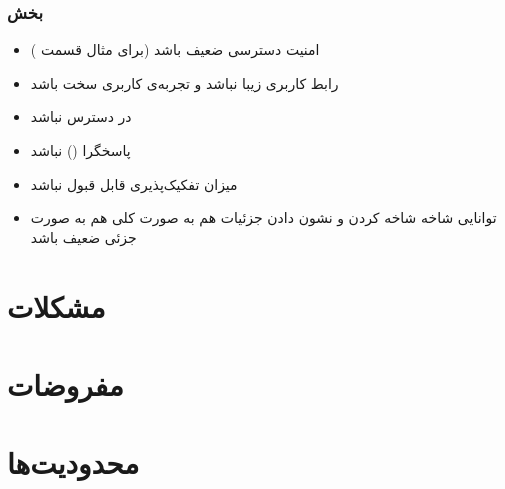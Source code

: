 \subsubsection{بخش }
\begin{itemize}
\item[\risk]
امنیت دسترسی ضعیف باشد (برای مثال قسمت )

\item[\risk]
رابط کاربری زیبا نباشد و تجربه‌ی کاربری سخت باشد

\item[\risk]
در دسترس نباشد

\item[\risk]
پاسخگرا () نباشد

\item[\risk]
میزان تفکیک‌پذیری قابل قبول نباشد

\item[\risk]
توانایی شاخه شاخه کردن و نشون دادن جزئیات هم به صورت کلی هم به صورت جزئی ضعیف باشد
\end{itemize}

\section{مشکلات }

\section{مفروضات }

\section{محدودیت‌ها }

